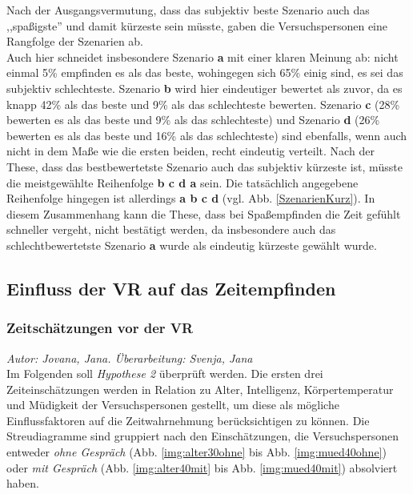 \documentclass{Paper}
\begin{document}
Nach der Ausgangsvermutung, dass das subjektiv beste Szenario auch das ,,spaßigste'' und damit kürzeste sein müsste, gaben die Versuchspersonen eine Rangfolge der Szenarien ab.\\
Auch hier schneidet insbesondere Szenario \textbf{a} mit einer klaren Meinung ab: nicht einmal 5\% empfinden es als das beste, wohingegen sich 65\% einig sind, es sei das subjektiv schlechteste. Szenario \textbf{b} wird hier eindeutiger bewertet als zuvor, da es knapp 42\% als das beste und 9\% als das schlechteste bewerten. Szenario \textbf{c} (28\% bewerten es als das beste und 9\% als das schlechteste) und Szenario \textbf{d} (26\% bewerten es als das beste und 16\% als das schlechteste) sind ebenfalls, wenn auch nicht in dem Maße wie die ersten beiden, recht eindeutig verteilt. 
Nach der These, dass das bestbewertetste Szenario auch das subjektiv kürzeste ist, müsste die meistgewählte Reihenfolge \textbf{b c d a} sein. 
Die tatsächlich angegebene Reihenfolge hingegen ist allerdings \textbf{a b c d} (vgl. Abb. \ref{SzenarienKurz}).
In diesem Zusammenhang kann die These, dass bei Spaßempfinden die Zeit gefühlt schneller vergeht, nicht bestätigt werden, da insbesondere auch das schlechtbewertetste Szenario \textbf{a} wurde als eindeutig kürzeste gewählt wurde. 

\subsection{Einfluss der VR auf das Zeitempfinden}
\subsubsection{Zeitschätzungen vor der VR}
 \textit{Autor: Jovana, Jana. Überarbeitung: Svenja, Jana}\\
Im Folgenden soll \textit{Hypothese 2} überprüft werden. Die ersten drei Zeiteinschätzungen werden in Relation zu  Alter, Intelligenz, Körpertemperatur und Müdigkeit der Versuchspersonen gestellt, um diese als mögliche Einflussfaktoren auf die Zeitwahrnehmung berücksichtigen zu können. Die Streudiagramme sind gruppiert nach den Einschätzungen, die Versuchspersonen entweder \textit{ohne Gespräch} (Abb. \ref{img:alter30ohne} bis Abb. \ref{img:mued40ohne}) oder \textit{mit Gespräch} (Abb. \ref{img:alter40mit} bis Abb. \ref{img:mued40mit}) absolviert haben.
\end{document}
